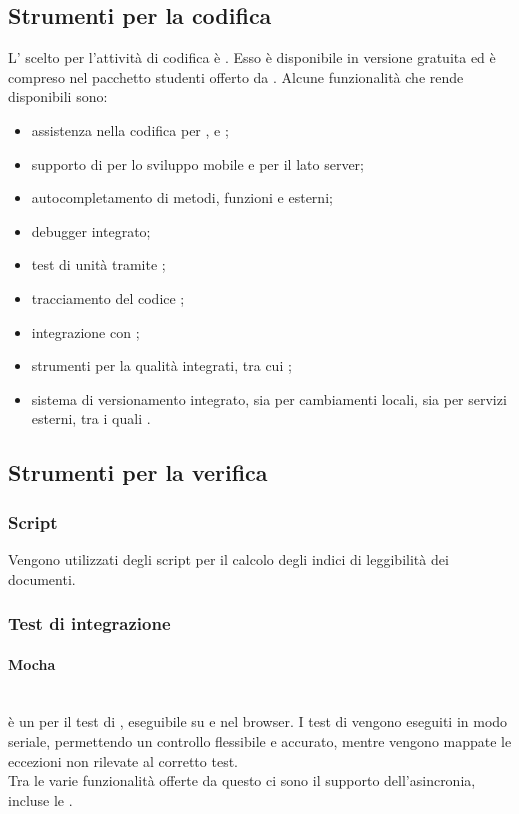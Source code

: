 \subsection{Strumenti per la codifica}
L' scelto per l'attività di codifica è \textbf{}. Esso è disponibile in versione gratuita ed è compreso nel pacchetto studenti offerto da . Alcune funzionalità che rende disponibili sono:
\begin{itemize}
	\item assistenza nella codifica per ,  e ;
	\item supporto di  per lo sviluppo mobile e  per il lato server;
	\item autocompletamento di metodi, funzioni e  esterni;
	\item debugger integrato;
	\item test di unità tramite ;
	\item tracciamento del codice ;
	\item integrazione con ;
	\item strumenti per la qualità integrati, tra cui ;
	\item sistema di versionamento integrato, sia per cambiamenti locali, sia per servizi esterni, tra i quali .
\end{itemize}

\subsection{Strumenti per la verifica}
\subsubsection{Script}
Vengono utilizzati degli script per il calcolo degli indici di leggibilità dei documenti.

\subsubsection{Test di integrazione}
\paragraph{Mocha}\mbox{}\\
 è un  per il test di , eseguibile su  e nel browser. I test di  vengono eseguiti in modo seriale, permettendo un controllo flessibile e accurato, mentre vengono mappate le eccezioni non rilevate al corretto test.\\
Tra le varie funzionalità offerte da questo  ci sono il supporto dell'asincronia, incluse le .

